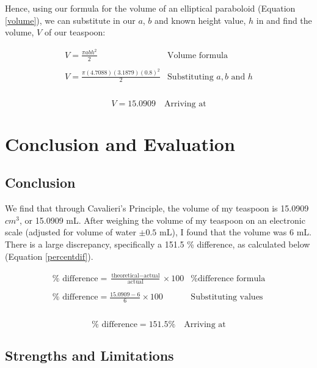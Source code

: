 \documentclass[12pt]{article}
\begin{document}
Hence, using our formula for the volume of an elliptical paraboloid (Equation \ref{volume}), we can substitute in our $a$, $b$ and known height value, $h$ in and find the volume, $V$ of our teaspoon:

$$
\begin{array}{l|c}
    V = \frac{\pi a b h^2}{2} & \text{Volume formula} \\ \\
    V = \frac{\pi (4.7088)(3.1879)(0.8)^2}{2} & \text{Substituting } a, b \text{ and } h \\ \\
 \end{array}
$$

\begin{equation}\label{solve.a!}
    \boxed{V = 15.0909}  \quad \text{Arriving at}
\end{equation}


\section{Conclusion and Evaluation}

\subsection{Conclusion}

We find that through Cavalieri's Principle, the volume of my teaspoon is 15.0909 $cm^3$, or 15.0909 mL. After weighing the volume of my teaspoon on an electronic scale (adjusted for volume of water $\pm 0.5$ mL), I found that the volume was 6 mL. There is a large discrepancy, specifically a 151.5 \% difference, as calculated below (Equation \ref{percentdif}). 

$$
\begin{array}{l|c}
    \% \text{ difference} = \frac{\text{theoretical} - \text{actual}}{\text{actual}} \times 100 & \text{\% difference formula} \\ \\
    \% \text{ difference} = \frac{15.0909 - 6}{6} \times 100 & \text{Substituting values} \\ \\
 \end{array}
$$

\begin{equation}\label{percentdif}
    \boxed{\% \text{ difference} = 151.5 \%}  \quad \text{Arriving at}
\end{equation}

\subsection{Strengths and Limitations}
\end{document}
